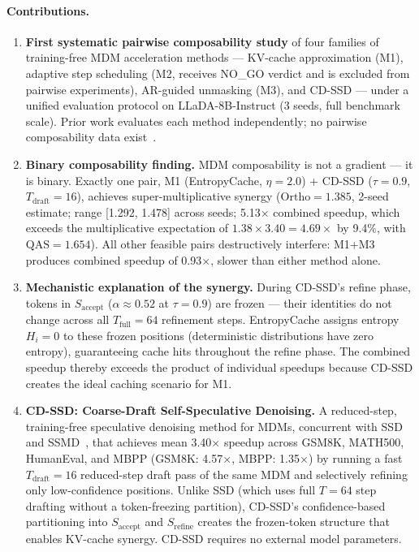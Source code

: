 \documentclass{article}
\newcommand{\ortho}{\text{Ortho}}
\newcommand{\qas}{\text{QAS}}
\newcommand{\Saccept}{S_{\text{accept}}}
\newcommand{\Srefine}{S_{\text{refine}}}
\newcommand{\Tdraft}{T_{\text{draft}}}
\newcommand{\Tfull}{T_{\text{full}}}
\begin{document}
\paragraph{Contributions.}
\begin{enumerate}
\item \textbf{First systematic pairwise composability study} of four families of training-free MDM
acceleration methods --- KV-cache approximation (M1), adaptive step scheduling (M2, receives NO\_GO
verdict and is excluded from pairwise experiments), AR-guided unmasking (M3), and CD-SSD --- under
a unified evaluation protocol on LLaDA-8B-Instruct (3 seeds, full benchmark scale). Prior work
evaluates each method independently; no pairwise composability data exist~\cite{entropycache,fastdllm,saber}.

\item \textbf{Binary composability finding.} MDM composability is not a gradient --- it is binary.
Exactly one pair, M1 (EntropyCache, $\eta=2.0$) + CD-SSD ($\tau=0.9$, $\Tdraft=16$), achieves
super-multiplicative synergy ($\ortho = 1.385$, 2-seed estimate; range [1.292, 1.478] across seeds;
5.13$\times$ combined speedup, which exceeds the multiplicative expectation of $1.38 \times 3.40 =
4.69\times$ by 9.4\%, with $\qas = 1.654$). All other feasible pairs destructively interfere:
M1+M3 produces combined speedup of 0.93$\times$, slower than either method alone.

\item \textbf{Mechanistic explanation of the synergy.} During CD-SSD's refine phase, tokens in
$\Saccept$ ($\alpha \approx 0.52$ at $\tau = 0.9$) are frozen --- their identities do not change
across all $\Tfull = 64$ refinement steps. EntropyCache assigns entropy $H_i = 0$ to these frozen
positions (deterministic distributions have zero entropy), guaranteeing cache hits throughout the
refine phase. The combined speedup thereby exceeds the product of individual speedups because CD-SSD
creates the ideal caching scenario for M1.

\item \textbf{CD-SSD: Coarse-Draft Self-Speculative Denoising.} A reduced-step, training-free
speculative denoising method for MDMs, concurrent with SSD~\cite{ssd} and SSMD~\cite{ssmd}, that
achieves mean 3.40$\times$ speedup across GSM8K, MATH500, HumanEval, and MBPP (GSM8K: 4.57$\times$,
MBPP: 1.35$\times$) by running a fast $\Tdraft=16$ reduced-step draft pass of the same MDM and
selectively refining only low-confidence positions. Unlike SSD (which uses full $T=64$ step drafting
without a token-freezing partition), CD-SSD's confidence-based partitioning into $\Saccept$ and
$\Srefine$ creates the frozen-token structure that enables KV-cache synergy. CD-SSD requires no
external model parameters.


\end{enumerate}
\end{document}
